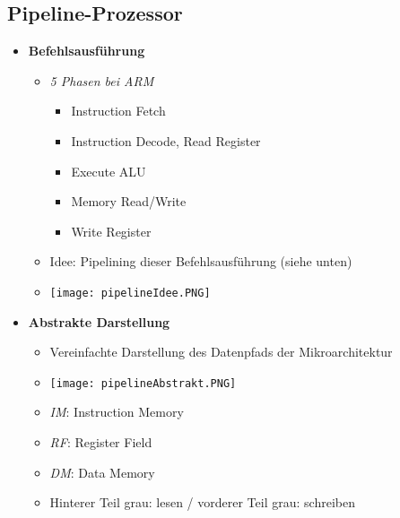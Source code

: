 \subsection{Pipeline-Prozessor}
    \begin{itemize}
        \item \textbf{Befehlsausführung}
            \begin{itemize}
                \item \textit{5 Phasen bei ARM}
                    \begin{itemize}
                        \item Instruction Fetch
                        \item Instruction Decode, Read Register
                        \item Execute ALU
                        \item Memory Read/Write
                        \item Write Register
                    \end{itemize}
                \item Idee: Pipelining dieser Befehlsausführung (siehe unten)
                \item[] \texttt{[image: pipelineIdee.PNG]}
            \end{itemize}

        \item \textbf{Abstrakte Darstellung}
            \begin{itemize}
                \item Vereinfachte Darstellung des Datenpfads der Mikroarchitektur
                \item[] \texttt{[image: pipelineAbstrakt.PNG]}
                \item \textit{IM}: Instruction Memory
                \item \textit{RF}: Register Field
                \item \textit{DM}: Data Memory
                \item Hinterer Teil grau: lesen / vorderer Teil grau: schreiben 
            \end{itemize}

\pagebreak


\end{itemize}
